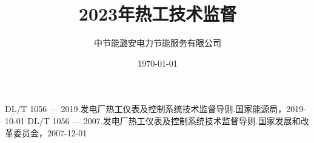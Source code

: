 \documentclass[UTF8]{ctexrep}
\title{2023年热工技术监督}
\author{中节能潞安电力节能服务有限公司}
\date{\today}
\begin{document}
\maketitle
\tableofcontents
\listoftables


\appendix
\begin{appendices}
\end{appendices}



\begin{thebibliography}{99}
	 DL/T 1056 --- 2019.发电厂热工仪表及控制系统技术监督导则.国家能源局，2019-10-01
	 DL/T 1056 --- 2007.发电厂热工仪表及控制系统技术监督导则.国家发展和改革委员会，2007-12-01
\end{thebibliography}
\end{document}
